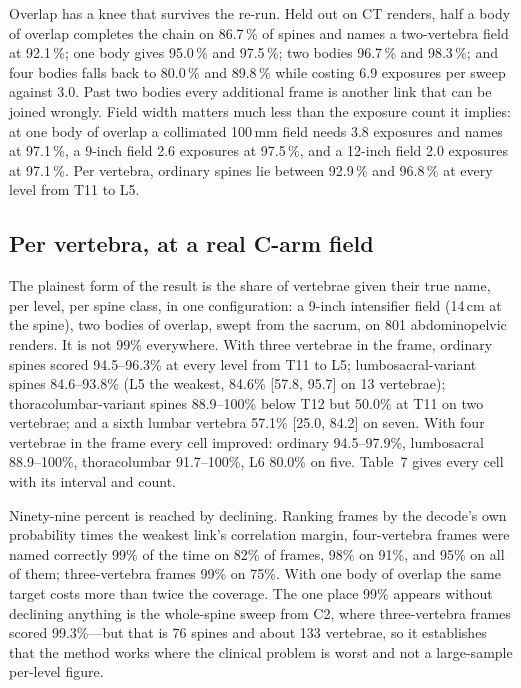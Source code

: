 \documentclass[11pt,letterpaper]{article}
\newcommand{\ci}[2]{[#1, #2]}
\begin{document}
Overlap has a knee that survives the re-run. Held out on CT renders, half a body of overlap completes the chain on 86.7\,\% of spines and names a two-vertebra field at 92.1\,\%; one body gives 95.0\,\% and 97.5\,\%; two bodies 96.7\,\% and 98.3\,\%; and four bodies falls back to 80.0\,\% and 89.8\,\% while costing 6.9 exposures per sweep against 3.0. Past two bodies every additional frame is another link that can be joined wrongly. Field width matters much less than the exposure count it implies: at one body of overlap a collimated 100\,mm field needs 3.8 exposures and names at 97.1\,\%, a 9-inch field 2.6 exposures at 97.5\,\%, and a 12-inch field 2.0 exposures at 97.1\,\%. Per vertebra, ordinary spines lie between 92.9\,\% and 96.8\,\% at every level from T11 to L5.

\subsection*{Per vertebra, at a real C-arm field}
The plainest form of the result is the share of vertebrae given their true name, per level, per spine class, in one configuration: a 9-inch intensifier field (14\,cm at the spine), two bodies of overlap, swept from the sacrum, on 801 abdominopelvic renders. It is not 99\% everywhere. With three vertebrae in the frame, ordinary spines scored 94.5--96.3\% at every level from T11 to L5; lumbosacral-variant spines 84.6--93.8\% (L5 the weakest, 84.6\% \ci{57.8}{95.7} on 13 vertebrae); thoracolumbar-variant spines 88.9--100\% below T12 but 50.0\% at T11 on two vertebrae; and a sixth lumbar vertebra 57.1\% \ci{25.0}{84.2} on seven. With four vertebrae in the frame every cell improved: ordinary 94.5--97.9\%, lumbosacral 88.9--100\%, thoracolumbar 91.7--100\%, L6 80.0\% on five. Table~7 gives every cell with its interval and count.

Ninety-nine percent is reached by declining. Ranking frames by the decode's own probability times the weakest link's correlation margin, four-vertebra frames were named correctly 99\% of the time on 82\% of frames, 98\% on 91\%, and 95\% on all of them; three-vertebra frames 99\% on 75\%. With one body of overlap the same target costs more than twice the coverage. The one place 99\% appears without declining anything is the whole-spine sweep from C2, where three-vertebra frames scored 99.3\%---but that is 76 spines and about 133 vertebrae, so it establishes that the method works where the clinical problem is worst and not a large-sample per-level figure.
\end{document}
